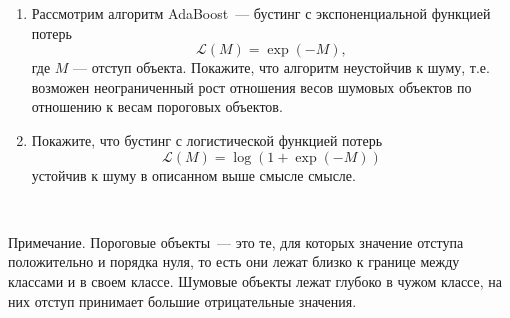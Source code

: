 \documentclass[10pt]{article}
\begin{document}
    \begin{enumerate}
      \item Рассмотрим алгоритм AdaBoost~--- бустинг с экспоненциальной функцией потерь \\
      $$\mathcal{L}(M)=\exp(-M),$$
где $M$ — отступ объекта. Покажите, что алгоритм неустойчив к шуму, т.е. возможен неограниченный рост отношения весов шумовых объектов по отношению к весам пороговых объектов.
      \item Покажите, что бустинг с логистической функцией потерь\\
      $$\mathcal{L}(M) = \log (1+\exp(-M))$$
устойчив к шуму в описанном выше смысле смысле.
    \end{enumerate}
    
    ~
    
    Примечание. Пороговые объекты~--- это те, для которых значение отступа положительно и порядка нуля, то есть они лежат близко к границе между классами и в своем классе. Шумовые объекты лежат глубоко в чужом классе, на них отступ принимает большие отрицательные значения. 
\bigskip
\end{document}
